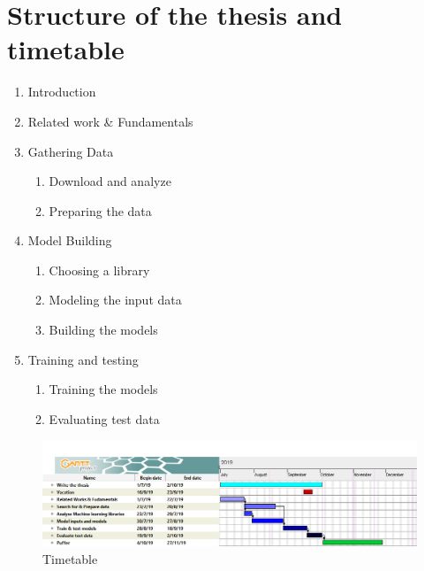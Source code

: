 \documentclass[12pt,a4paper]{scrartcl}
\begin{document}
	\pagebreak
	\section{Structure of the thesis and timetable}
	\begin{enumerate}[label*=\arabic*.]
		\item Introduction
		\item Related work \& Fundamentals
		\item Gathering Data
		\begin{enumerate}[label*=\arabic*.]
			\item Download and analyze
			\item Preparing the data
		\end{enumerate}
		\item Model Building
		\begin{enumerate}[label*=\arabic*.]
			\item Choosing a library
			\item Modeling the input data
			\item Building the models
		\end{enumerate}
		\item Training and testing
		\begin{enumerate}[label*=\arabic*.]
			\item Training the models
			\item Evaluating test data
		\end{enumerate}
	\end{enumerate}
	
	\begin{figure}
		\centering
		\includegraphics[width=1.0\linewidth]{Timetable/Timetable}
		\caption{Timetable}
		\label{fig:timetable}
	\end{figure}
	\pagebreak
	
	
	
\end{document}
